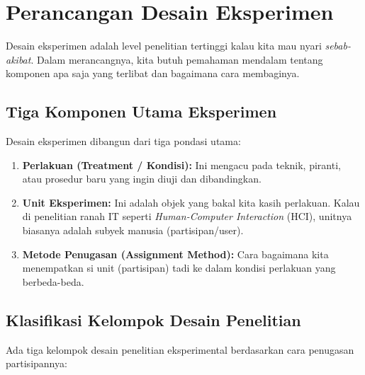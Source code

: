\documentclass[12pt,a4paper]{article}
\begin{document}
\newpage
\section{Perancangan Desain Eksperimen}

Desain eksperimen adalah level penelitian tertinggi kalau kita mau nyari \textit{sebab-akibat}. Dalam merancangnya, kita butuh pemahaman mendalam tentang komponen apa saja yang terlibat dan bagaimana cara membaginya.

\subsection{Tiga Komponen Utama Eksperimen}
Desain eksperimen dibangun dari tiga pondasi utama:
\begin{enumerate}
    \item \textbf{Perlakuan (Treatment / Kondisi):} Ini mengacu pada teknik, piranti, atau prosedur baru yang ingin diuji dan dibandingkan.
    \item \textbf{Unit Eksperimen:} Ini adalah objek yang bakal kita kasih perlakuan. Kalau di penelitian ranah IT seperti \textit{Human-Computer Interaction} (HCI), unitnya biasanya adalah subyek manusia (partisipan/user).
    \item \textbf{Metode Penugasan (Assignment Method):} Cara bagaimana kita menempatkan si unit (partisipan) tadi ke dalam kondisi perlakuan yang berbeda-beda.
\end{enumerate}

\subsection{Klasifikasi Kelompok Desain Penelitian}
Ada tiga kelompok desain penelitian eksperimental berdasarkan cara penugasan partisipannya:
\end{document}
